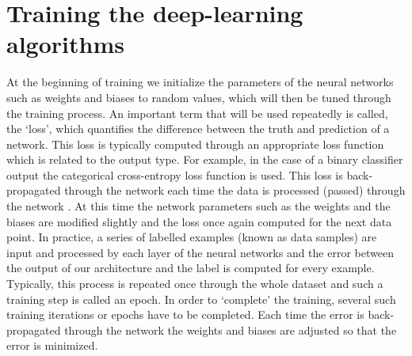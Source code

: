 \documentclass{aa}
\begin{document}
    


\section{Training the deep-learning algorithms}\label{sec: training ML}

At the beginning of training we initialize the parameters of the neural networks such as weights and biases to random values, which will then be tuned through the training process. %
An important term that will be used repeatedly is called, the `loss', which quantifies the difference between the truth and prediction of a network.
This loss is typically computed through an appropriate loss function which is related to the output type. For example, in the case of a binary classifier output the categorical cross-entropy loss function is used.
This loss is back-propagated through the network each time the data is processed (passed) through the network \citep{Rojas1996}.
At this time the network parameters such as the weights and the biases are modified slightly and the loss once again computed for the next data point.
In practice, a series of labelled examples (known as data samples) are input and processed by each layer of the neural networks and the error between the output of our architecture and the label is computed for every example.
Typically, this process is repeated once through the whole dataset and such a training step is called an epoch.
In order to `complete' the training, several such training iterations or epochs have to be completed.
Each time the error is back-propagated through the network the weights and biases are adjusted so that the error is minimized.
\end{document}
